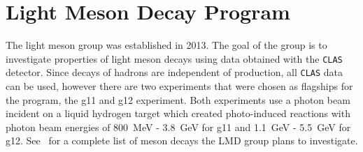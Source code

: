\documentclass[epj]{webofc}
\begin{document}
\section{Light Meson Decay Program}
The light meson group was established in 2013. The goal of the group is to investigate properties of light meson decays using data obtained with the \textsc{\texttt{CLAS}} detector.
Since decays of hadrons are independent of production, all \textsc{\texttt{CLAS}} data can be used, however there are two experiments that were chosen as flagships for the program, the g11 and g12 experiment. Both experiments use a photon beam incident on a liquid hydrogen target which created photo-induced reactions with photon beam energies of 800~MeV - 3.8~GeV for g11 and 1.1~GeV - 5.5~GeV for g12.  See~\cite{lmdCAA} for a complete list of meson decays the LMD group plans to investigate.
%
\end{document}

